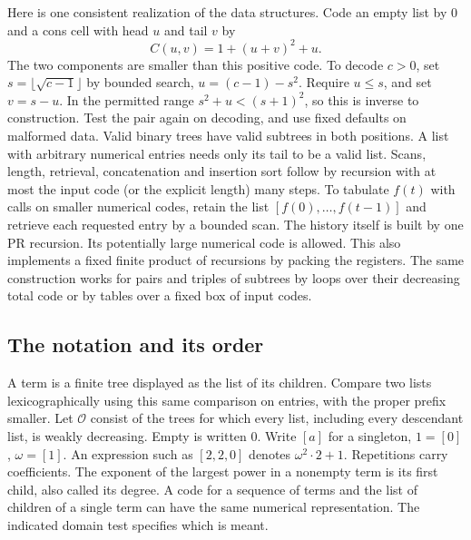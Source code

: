 Here is one consistent realization of the data structures. Code an empty list by $0$ and a cons cell with head $u$ and tail $v$ by
\[
 C(u,v)=1+(u+v)^2+u .
\]
The two components are smaller than this positive code. To decode $c>0$, set $s=\lfloor\sqrt{c-1}\rfloor$ by bounded search, $u=(c-1)-s^2$. Require $u\le s$, and set $v=s-u$. In the permitted range $s^2+u<(s+1)^2$, so this is inverse to construction. Test the pair again on decoding, and use fixed defaults on malformed data. Valid binary trees have valid subtrees in both positions. A list with arbitrary numerical entries needs only its tail to be a valid list. Scans, length, retrieval, concatenation and insertion sort follow by recursion with at most the input code (or the explicit length) many steps. To tabulate $f(t)$ with calls on smaller numerical codes, retain the list $[f(0),\ldots,f(t-1)]$ and retrieve each requested entry by a bounded scan. The history itself is built by one PR recursion. Its potentially large numerical code is allowed. This also implements a fixed finite product of recursions by packing the registers. The same construction works for pairs and triples of subtrees by loops over their decreasing total code or by tables over a fixed box of input codes.

\subsection{The notation and its order}
A term is a finite tree displayed as the list of its children. Compare two lists lexicographically using this same comparison on entries, with the proper prefix smaller. Let $\mathcal O$ consist of the trees for which every list, including every descendant list, is weakly decreasing. Empty is written $0$. Write $[a]$ for a singleton, $1=[0]$, $\omega=[1]$. An expression such as $[2,2,0]$ denotes $\omega^2\cdot 2+1$. Repetitions carry coefficients. The exponent of the largest power in a nonempty term is its first child, also called its degree. A code for a sequence of terms and the list of children of a single term can have the same numerical representation. The indicated domain test specifies which is meant.

